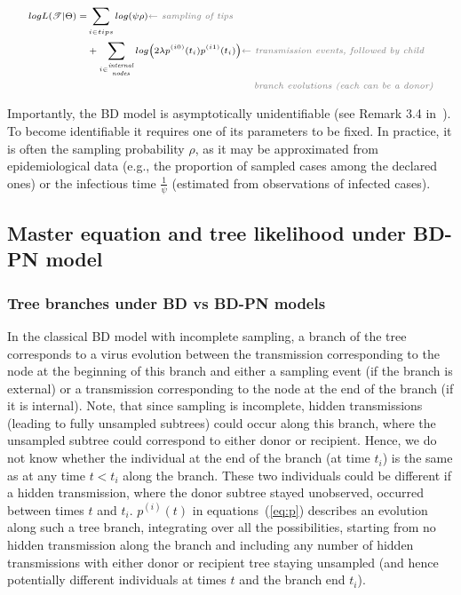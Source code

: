 \documentclass[a4paper,10pt]{article}
\begin{document}
\begin{equation}
\scriptsize
\begin{split}
log L(\mathscr{T}|\Theta) =  &\sum\limits_{i \in tips}  log(\psi \rho)  \textit{\color{gray} $\leftarrow$ sampling of tips} \\
 &+\sum\limits_{i \in \stackanchor{\tiny\textit{internal}}{\tiny\textit{nodes}}} log \big(2 \lambda p^{(i0)}(t_i)p^{(i1)}(t_i)\big)   \textit{\color{gray} $\leftarrow$ transmission events, followed by child }\\
 & ~~~~~~~~~~~~~~~~~~~~~~~~~~~~~~~~~~~~~~~~~~~~~~~~~~\textit{\color{gray} branch evolutions (each can be a donor)}  \label{eq:mtbd_tree_likelihood}
\end{split}
\end{equation}



Importantly, the BD model is asymptotically unidentifiable (see Remark 3.4 in~\citep{Stadler2009}). To become identifiable it requires one of its parameters to be fixed. In practice, it is often the sampling probability $\rho$, as it may be approximated from epidemiological data (e.g., the proportion of sampled cases among the declared ones) or the infectious time $\frac{1}{\psi}$ (estimated from observations of infected cases). 

\subsection{Master equation and tree likelihood under BD-PN model}

\subsubsection{Tree branches under BD vs BD-PN models}

In the classical BD model with incomplete sampling, a branch of the tree corresponds to a virus evolution between the transmission corresponding to the node at the beginning of this branch and either a sampling event (if the branch is external) or a transmission corresponding to the node at the end of the branch (if it is internal). Note, that since sampling is incomplete, hidden transmissions (leading to fully unsampled subtrees) could occur along this branch, where the unsampled subtree could correspond to either donor or recipient.  Hence, we do not know whether the individual at the end of the branch (at time $t_i$) is the same as at any time $t < t_i$ along the branch. These two individuals could be different if a hidden transmission, where the donor subtree stayed unobserved, occurred between times $t$ and $t_i$. $p^{(i)}(t)$ in equations~(\ref{eq:p}) describes an evolution along such a tree branch, integrating over all the possibilities, starting from no hidden transmission along the branch and including any number of hidden transmissions with either donor or recipient tree staying unsampled (and hence potentially different individuals at times $t$ and the branch end $t_i$).
\end{document}

